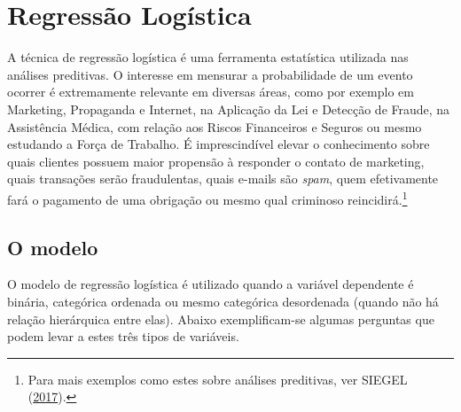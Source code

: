 \documentclass[12pt,brazil,]{book}
\let\rmarkdownfootnote\footnote%
\def\footnote{\protect\rmarkdownfootnote}
\begin{document}
\hypertarget{regressao-logistica}{%
\chapter{Regressão Logística}\label{regressao-logistica}}

A técnica de regressão logística é uma ferramenta estatística utilizada
nas análises preditivas. O interesse em mensurar a probabilidade de um
evento ocorrer é extremamente relevante em diversas áreas, como por
exemplo em Marketing, Propaganda e Internet, na Aplicação da Lei e
Detecção de Fraude, na Assistência Médica, com relação aos Riscos
Financeiros e Seguros ou mesmo estudando a Força de Trabalho. É
imprescindível elevar o conhecimento sobre quais clientes possuem maior
propensão à responder o contato de marketing, quais transações serão
fraudulentas, quais e-mails são \emph{spam}, quem efetivamente fará o
pagamento de uma obrigação ou mesmo qual criminoso reincidirá.\footnote{Para
  mais exemplos como estes sobre análises preditivas, ver SIEGEL
  (\protect\hyperlink{ref-Siegel2017}{2017}).}

\hypertarget{o-modelo}{%
\section{O modelo}\label{o-modelo}}

O modelo de regressão logística é utilizado quando a variável dependente
é binária, categórica ordenada ou mesmo categórica desordenada (quando
não há relação hierárquica entre elas). Abaixo exemplificam-se algumas
perguntas que podem levar a estes três tipos de variáveis.
\end{document}
